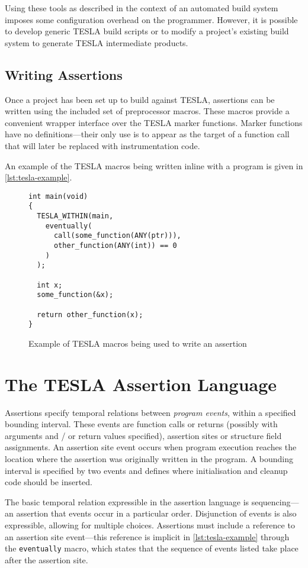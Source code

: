 Using these tools as described in the context of an automated build system
imposes some configuration overhead on the programmer. However, it is
possible to develop generic TESLA build scripts or to modify a project's
existing build system to generate TESLA intermediate products.

\subsection{Writing Assertions}

Once a project has been set up to build against TESLA, assertions can be
written using the included set of preprocessor macros. These macros
provide a convenient wrapper interface over the TESLA marker functions.
Marker functions have no definitions---their only use is to appear as
the target of a function call that will later be replaced with
instrumentation code.

An example of the TESLA macros being written inline with a program is
given in \autoref{lst:tesla-example}.

\begin{figure}
  \begin{verbatim}
int main(void)
{
  TESLA_WITHIN(main,
    eventually(
      call(some_function(ANY(ptr))),
      other_function(ANY(int)) == 0
    )
  );

  int x;
  some_function(&x);

  return other_function(x);
}
  \end{verbatim}
  \caption{Example of TESLA macros being used to write an assertion}
  \label{lst:tesla-example}
\end{figure}

\section{The TESLA Assertion Language} \label{sec:assertions}

Assertions specify temporal relations between \emph{program events},
within a specified bounding interval. These events are function calls or
returns (possibly with arguments and / or return values specified),
assertion sites or structure field assignments. An assertion site event
occurs when program execution reaches the location where the assertion
was originally written in the program. A bounding interval is specified
by two events and defines where initialisation and cleanup code should
be inserted.

The basic temporal relation expressible in the assertion language is
sequencing---an assertion that events occur in a particular order.
Disjunction of events is also expressible, allowing for multiple
choices. Assertions must include a reference to an assertion site
event---this reference is implicit in \autoref{lst:tesla-example}
through the \texttt{eventually} macro, which states that the
sequence of events listed take place after the assertion site.

